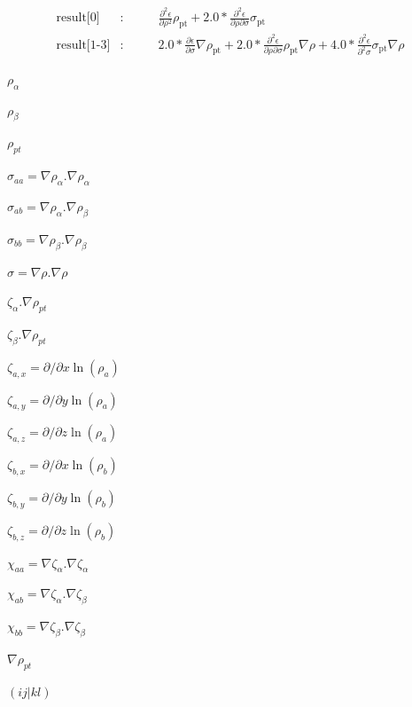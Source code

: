 \documentclass{article}
\begin{document}
\begin{eqnarray*}
    \mbox{result[0]}    &:& \qquad \frac{\partial^2 \epsilon}{\partial \rho^2} \rho_\mathrm{pt}
                            + 2.0 * \frac{\partial^2 \epsilon}{\partial \rho\partial\sigma}\sigma_\mathrm{pt}\\
    \mbox{result[1-3]}  &:& \qquad 2.0 * \frac{\partial\epsilon}{\partial\sigma}\nabla\rho_\mathrm{pt}
                            + 2.0 * \frac{\partial^2\epsilon}{\partial\rho\partial\sigma} \rho_\mathrm{pt}\nabla\rho
                            + 4.0 * \frac{\partial^2\epsilon}{\partial^2\sigma} \sigma_\mathrm{pt}\nabla\rho
\end{eqnarray*}
\pagebreak

$ \rho_\alpha $
\pagebreak

$ \rho_\beta $
\pagebreak

$ \rho_{pt} $
\pagebreak

$ \sigma_{aa} = \nabla \rho_{\alpha}.\nabla \rho_{\alpha} $
\pagebreak

$ \sigma_{ab} = \nabla \rho_{\alpha}.\nabla \rho_{\beta} $
\pagebreak

$ \sigma_{bb} = \nabla \rho_{\beta}.\nabla \rho_{\beta} $
\pagebreak

$ \sigma = \nabla \rho.\nabla \rho $
\pagebreak

$ \zeta_{\alpha}.\nabla\rho_{pt} $
\pagebreak

$ \zeta_{\beta}.\nabla\rho_{pt} $
\pagebreak

$ \zeta_{a,x}=\partial/{\partial x} \ln(\rho_a)  $
\pagebreak

$ \zeta_{a,y}=\partial/{\partial y} \ln(\rho_a)  $
\pagebreak

$ \zeta_{a,z}=\partial/{\partial z} \ln(\rho_a)  $
\pagebreak

$ \zeta_{b,x} = \partial/{\partial x} \ln(\rho_b)  $
\pagebreak

$ \zeta_{b,y} = \partial/{\partial y} \ln(\rho_b)  $
\pagebreak

$ \zeta_{b,z} = \partial/{\partial z} \ln(\rho_b)  $
\pagebreak

$ \chi_{aa} = \nabla \zeta_{\alpha}.\nabla \zeta_{\alpha} $
\pagebreak

$ \chi_{ab} = \nabla \zeta_{\alpha}.\nabla \zeta_{\beta} $
\pagebreak

$ \chi_{bb} = \nabla \zeta_{\beta}.\nabla \zeta_{\beta} $
\pagebreak

$ \nabla\rho_{pt}$
\pagebreak

$(ij|kl)$
\pagebreak
\end{document}
